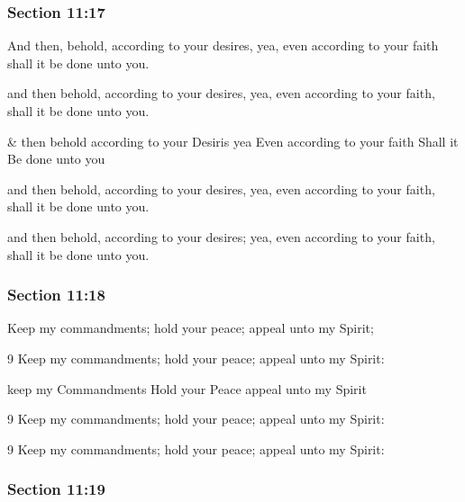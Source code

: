	\subsubsection{Section 11:17} %
		\label{DC11-17}

		And then, behold, according to your desires, yea, even according to your faith shall it be done unto you.

		\begin{framed}
		\scriptsize
			\begin{compactdesc}
				\item[JSP] and then behold, according to your desires, yea, even according to your faith, shall it be done unto you.
				\item[HS] \& then behold according to your Desiris yea Even according to your faith Shall it Be done unto you
				\item[DC 1835] and then behold, according to your desires, yea, even according to your faith, shall it be done unto you.
				\item[DC 1844] and then behold, according to your desires; yea, even according to your faith, shall it be done unto you.
			\end{compactdesc}
		\end{framed}

	\subsubsection{Section 11:18} %
		\label{DC11-18}

		Keep my commandments; hold your peace; appeal unto my Spirit;

		\begin{framed}
		\scriptsize
			\begin{compactdesc}
				\item[JSP] 9 Keep my commandments; hold your peace; appeal unto my Spirit: 
				\item[HS] keep my Commandments Hold your Peace appeal unto my Spirit 
				\item[DC 1835] 9 Keep my commandments; hold your peace; appeal unto my Spirit: 
				\item[DC 1844] 9 Keep my commandments; hold your peace; appeal unto my Spirit: 
			\end{compactdesc}
		\end{framed}

	\subsubsection{Section 11:19} %
		\label{DC11-19}


